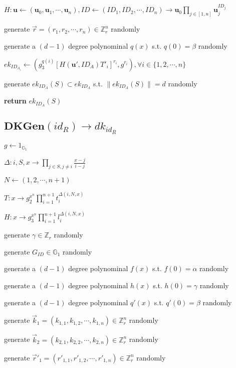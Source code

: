 \documentclass[a4paper]{article}
\begin{document}
$H: \bm{u} \gets (\bm{u}_0, \bm{u}_1, \cdots, \bm{u}_n), \textit{ID} \gets (\textit{ID}_1, \textit{ID}_2, \cdots, \textit{ID}_n) \rightarrow \bm{u}_0\prod\limits_{j \in [1, n]} \bm{u}_j^{\textit{ID}_j}$

generate $\vec{r} = (r_1, r_2, \cdots, r_n) \in \mathbb{Z}_r^n$ randomly

generate a $(d - 1)$ degree polynominal $q(x)$ s.t. $q(0) = \beta$ randomly

$\textit{ek}_{\textit{ID}_{A_i}} \gets (g_3^{q(i)} [H(\bm{u}', \textit{ID}_A)T'_i]^{r_i}, g^{r_i}), \forall i \in \{1, 2, \cdots, n\}$

generate $\textit{ek}_{\textit{ID}_A}(S) \subset \textit{ek}_{\textit{ID}_A}$ s.t. $\|\textit{ek}_{\textit{ID}_A}(S)\| = d$ randomly

\textbf{return} $\textit{ek}_{\textit{ID}_A}(S)$

\subsection{$\textbf{DKGen}(\textit{id}_R) \rightarrow \textit{dk}_{\textit{id}_R}$}

$g \gets 1_{\mathbb{G}_1}$

$\Delta: i, S, x \rightarrow \prod\limits_{j \in S, j \neq i} \frac{x - j}{i - j}$

$N \gets (1, 2, \cdots, n + 1)$

$T: x \rightarrow g_2^{x^n} \prod\limits_{i = 1}^{n + 1} t_i^{\Delta(i, N, x)}$

$H: x \rightarrow g_3^{x^n} \prod\limits_{i = 1}^{n + 1} l_i^{\Delta(i, N, x)}$

generate $\gamma \in \mathbb{Z}_r$ randomly

generate $G_{\textit{ID}} \in \mathbb{G}_1$ randomly

generate a $(d - 1)$ degree polynominal $f(x)$ s.t. $f(0) = \alpha$ randomly

generate a $(d - 1)$ degree polynominal $h(x)$ s.t. $h(0) = \gamma$ randomly

generate a $(d - 1)$ degree polynominal $q'(x)$ s.t. $q'(0) = \beta$ randomly

generate $\vec{k}_1 = (k_{1, 1}, k_{1, 2}, \cdots, k_{1, n}) \in \mathbb{Z}_r^n$ randomly

generate $\vec{k}_2 = (k_{2, 1}, k_{2, 2}, \cdots, k_{2, n}) \in \mathbb{Z}_r^n$ randomly

generate $\vec{r}'_1 = (r'_{1, 1}, r'_{1, 2}, \cdots, r'_{1, n}) \in \mathbb{Z}_r^n$ randomly
\end{document}
